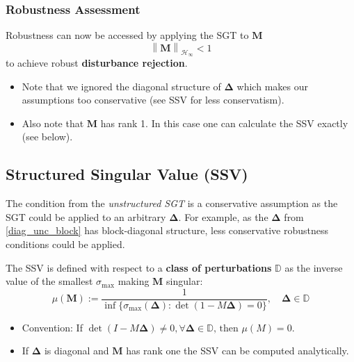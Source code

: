 \subsubsection{Robustness Assessment}
Robustness can now be accessed by applying the SGT to $\mathbf{M}$
\begin{equation*}
    \left\|\mathbf{M}\right\|_{\mathcal{H}_\infty}<1
\end{equation*}
to achieve robust \textbf{disturbance rejection}.

\newpar{}
\begin{itemize}
    \item Note that we ignored the diagonal structure of $\boldsymbol{\Delta}$ which makes our assumptions too conservative (see SSV for less conservatism).
    \item Also note that $\mathbf{M}$ has rank 1. In this case one can calculate the SSV exactly (see below).
\end{itemize}

\subsection{Structured Singular Value (SSV)}
The condition from the \textit{unstructured SGT} is a conservative assumption as the SGT could be applied to an arbitrary $\boldsymbol{\Delta}$.
For example, as the $\boldsymbol{\Delta}$ from \ref{diag_unc_block} has block-diagonal structure, less conservative robustness conditions could be applied.

\newpar{}

The SSV is defined with respect to a \textbf{class of perturbations} $\mathbb{D}$ as the inverse value of the smallest $\sigma_{\max}$ making $\mathbf{M}$ singular:
\begin{equation*}
    \mu(\mathbf{M}):=\frac1{\inf\{\sigma_{\max}(\boldsymbol{\Delta}):\det(1-M\boldsymbol{\Delta})=0\}},\quad\boldsymbol{\Delta}\in\mathbb{D}
\end{equation*}
\begin{itemize}
    \item Convention: If $\det(I-M\boldsymbol{\Delta})\neq0,\forall\boldsymbol{\Delta}\in\mathbb{D}\text{, then }\mu(M)=0$.
    \item If $\boldsymbol{\Delta}$ is diagonal and $\mathbf{M}$ has rank one the SSV can be computed analytically.
\end{itemize}

